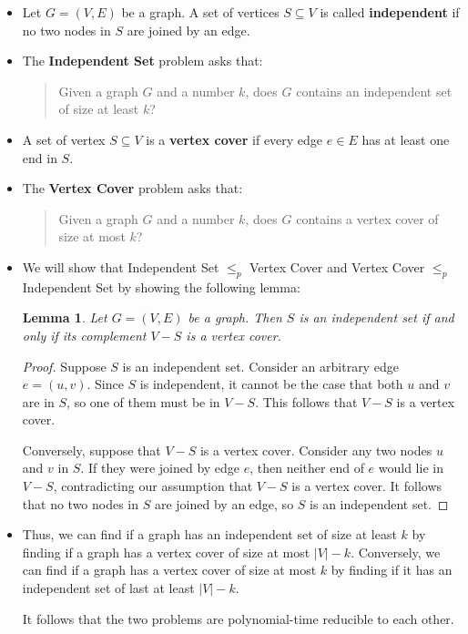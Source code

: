 \documentclass[10pt]{article}
\newtheorem{lemma}{Lemma}[section]
\begin{document}
  \begin{itemize}
    \item Let $G = (V,E)$ be a graph. A set of vertices $S \subseteq V$ is called
      {\bf independent} if no two nodes in $S$ are joined by an edge.
      
    \item The {\bf Independent Set} problem asks that:
      \begin{quote}
        Given a graph $G$ and a number $k$, does $G$ contains an independent set of
        size at least $k$?
      \end{quote}
    
    \item A set of vertex $S \subseteq V$ is a {\bf vertex cover} if every edge
      $e \in E$ has at least one end in $S$.
      
    \item The \textbf{Vertex Cover} problem asks that:
      \begin{quote}
        Given a graph $G$ and a number $k$, does $G$ contains a vertex cover
        of size at most $k$?
      \end{quote}
      
    \item We will show that Independent Set $\leq_p$ Vertex Cover and
      Vertex Cover $\leq_p$ Independent Set by showing the following lemma:
      \begin{lemma}
        Let $G = (V,E)$ be a graph. Then $S$ is an independent set if and
        only if its complement $V - S$ is a vertex cover.
      \end{lemma}
      \begin{proof}
        Suppose $S$ is an independent set. Consider an arbitrary edge $e = (u,v)$.
        Since $S$ is independent, it cannot be the case that both $u$ and $v$
        are in $S$, so one of them must be in $V-S$. This follows that
        $V-S$ is a vertex cover.
        
        Conversely, suppose that $V-S$ is a vertex cover. Consider any two nodes
        $u$ and $v$ in $S$. If they were joined by edge $e$, then neither end of $e$
        would lie in $V-S$, contradicting our assumption that $V-S$ is a vertex cover.
        It follows that no two nodes in $S$ are joined by an edge, so $S$ is an independent set.
      \end{proof}
    
    \item Thus, we can find if a graph has an independent set of size at least $k$ by
      finding if a graph has a vertex cover of size at most $|V|-k$. Conversely,
      we can find if a graph has a vertex cover of size at most $k$ by finding if it
      has an independent set of last at least $|V|-k$.
      
      It follows that the two problems are polynomial-time reducible to each other.
  \end{itemize}
  
\end{document}
